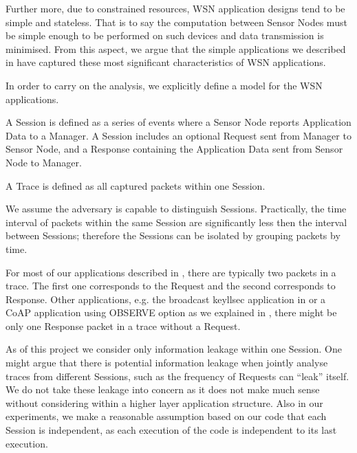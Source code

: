 Further more, due to constrained resources, WSN application designs tend to be simple and stateless. That is to say the computation between Sensor Nodes must be simple enough to be performed on such devices and data transmission is minimised. From this aspect, we argue that the simple applications we described in  have captured these most significant characteristics of WSN applications.

In order to carry on the analysis, we explicitly define a model for the WSN applications.

\begin{definition} \label{Def: Session}
A Session is defined as a series of events where a Sensor Node reports Application Data to a Manager. A Session includes an optional Request sent from Manager to Sensor Node, and a Response containing the Application Data sent from Sensor Node to Manager.
\end{definition}

\begin{definition} \label{Def: Trace}
A Trace is defined as all captured packets within one Session.
\end{definition}

We assume the adversary is capable to distinguish Sessions. Practically, the time interval of packets within the same Session are significantly less then the interval between Sessions; therefore the Sessions can be isolated by grouping packets by time.

For most of our applications described in , there are typically two packets in a trace. The first one corresponds to the Request and the second corresponds to Response. Other applications, e.g. the broadcast keyllsec application in  or a CoAP application using OBSERVE option as we explained in , there might be only one Response packet in a trace without a Request.

As of this project we consider only information leakage within one Session. One might argue that there is potential information leakage when jointly analyse traces from different Sessions, such as the frequency of Requests can ``leak'' itself. We do not take these leakage into concern as it does not make much sense without considering within a higher layer application structure.  Also in our experiments, we make a reasonable assumption based on our code that each Session is independent, as each execution of the code is independent to its last execution.

